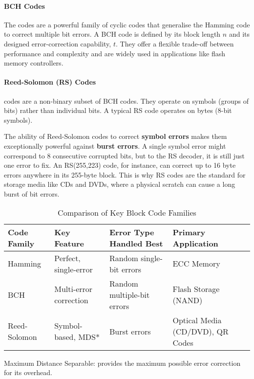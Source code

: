 \paragraph{BCH Codes}
The  codes are a powerful family of cyclic codes that generalise the Hamming code to correct multiple bit errors. A BCH code is defined by its block length $n$ and its designed error-correction capability, $t$. They offer a flexible trade-off between performance and complexity and are widely used in applications like flash memory controllers.

\paragraph{Reed-Solomon (RS) Codes}
 codes are a non-binary subset of BCH codes. They operate on symbols (groups of bits) rather than individual bits. A typical RS code operates on bytes (8-bit symbols).
\begin{warningbox}
    The ability of Reed-Solomon codes to correct \textbf{symbol errors} makes them exceptionally powerful against \textbf{burst errors}. A single symbol error might correspond to 8 consecutive corrupted bits, but to the RS decoder, it is still just one error to fix. An RS(255,223) code, for instance, can correct up to 16 byte errors anywhere in its 255-byte block. This is why RS codes are the standard for storage media like CDs and DVDs, where a physical scratch can cause a long burst of bit errors.
\end{warningbox}

\begin{table}[H]
    \centering
    \caption{Comparison of Key Block Code Families}
    \label{tab:block-code-summary}
    \begin{tabular}{@{}llll@{}}
        \toprule
        \tableheaderfont Code Family & \tableheaderfont Key Feature & \tableheaderfont Error Type Handled Best & \tableheaderfont Primary Application \\
        \midrule
        Hamming & Perfect, single-error & Random single-bit errors & ECC Memory \\
        BCH & Multi-error correction & Random multiple-bit errors & Flash Storage (NAND) \\
        Reed-Solomon & Symbol-based, MDS* & Burst errors & Optical Media (CD/DVD), QR Codes \\
        \bottomrule
    \end{tabular}
    \par\vspace{0.5em}
    \small *Maximum Distance Separable: provides the maximum possible error correction for its overhead.
\end{table}


